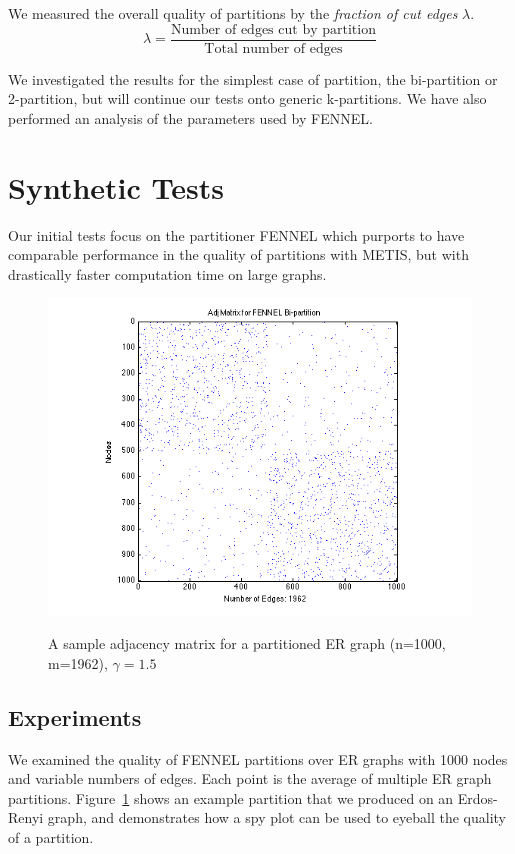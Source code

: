 \documentclass[11pt]{article}
\begin{document}
We measured the overall quality of partitions by the \textit{fraction of cut edges} $\lambda$.
\[\lambda = \frac{\text{Number of edges cut by partition}}{\text{Total number of edges}}\]

We investigated the results for the simplest case of partition, the bi-partition or 2-partition, but will continue our tests onto generic k-partitions.  
We have also performed an analysis of the parameters used by FENNEL.

\section*{Synthetic Tests} \vspace{-10 pt}
Our initial tests focus on the partitioner FENNEL which purports to have comparable performance in the quality of partitions with METIS, but with drastically faster computation time on large graphs. 

\begin{figure}[ht]
\centering
\caption{A sample adjacency matrix for a partitioned ER graph (n=1000, m=1962), $\gamma = 1.5$}
\includegraphics[scale=.65] {figures/adj_spy.png}
\label{fig:1}
\end{figure}

\subsection*{Experiments} \vspace{-10 pt}
We examined the quality of FENNEL partitions over ER graphs with 1000 nodes and variable numbers of edges. Each point is the average of multiple ER graph partitions. Figure~\ref{fig:1} shows an example partition that we produced on an Erdos-Renyi graph, and demonstrates how a spy plot can be used to eyeball the quality of a partition.
\end{document}
